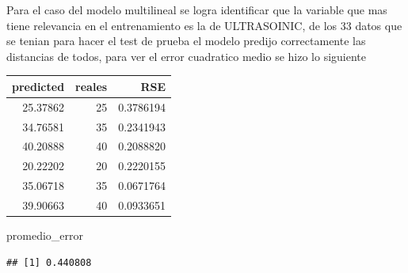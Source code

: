 \documentclass[
]{article}
\newenvironment{Shaded}{\begin{snugshade}}{\end{snugshade}}
\newcommand{\AttributeTok}[1]{\textcolor[rgb]{0.77,0.63,0.00}{#1}}
\newcommand{\DecValTok}[1]{\textcolor[rgb]{0.00,0.00,0.81}{#1}}
\newcommand{\FunctionTok}[1]{\textcolor[rgb]{0.00,0.00,0.00}{#1}}
\newcommand{\NormalTok}[1]{#1}
\newcommand{\OtherTok}[1]{\textcolor[rgb]{0.56,0.35,0.01}{#1}}
\newcommand{\SpecialCharTok}[1]{\textcolor[rgb]{0.00,0.00,0.00}{#1}}
\newcommand{\StringTok}[1]{\textcolor[rgb]{0.31,0.60,0.02}{#1}}
\begin{document}
Para el caso del modelo multilineal se logra identificar que la variable
que mas tiene relevancia en el entrenamiento es la de ULTRASOINIC, de
los 33 datos que se tenian para hacer el test de prueba el modelo
predijo correctamente las distancias de todos, para ver el error
cuadratico medio se hizo lo siguiente

\begin{Shaded}
\end{Shaded}

\begin{longtable}[]{@{}rrr@{}}
\toprule()
predicted & reales & RSE \\
\midrule()
\endhead
25.37862 & 25 & 0.3786194 \\
34.76581 & 35 & 0.2341943 \\
40.20888 & 40 & 0.2088820 \\
20.22202 & 20 & 0.2220155 \\
35.06718 & 35 & 0.0671764 \\
39.90663 & 40 & 0.0933651 \\
\bottomrule()
\end{longtable}

\begin{Shaded}
\begin{Highlighting}[]
\NormalTok{promedio\_error}
\end{Highlighting}
\end{Shaded}

\begin{verbatim}
## [1] 0.440808
\end{verbatim}
\end{document}
